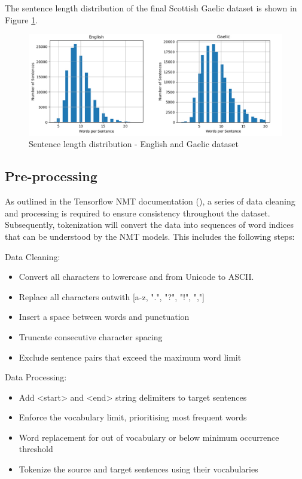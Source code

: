 The sentence length distribution of the final Scottish Gaelic dataset is shown in Figure \ref{fig:sentence_length-gaelic}.
\begin{figure}[ht!]
\centering
\includegraphics[width=1\textwidth]{media/methodology/s_length-2-en_gd.jpg}
\captionsetup{justification=centering}
\caption[Diagram of the Scottish Gaelic dataset sentence length distribution]{Sentence length distribution - English and Gaelic dataset}
\label{fig:sentence_length-gaelic}
\end{figure}


\subsection{Pre-processing}

As outlined in the Tensorflow \acrshort{NMT} documentation (\cite{tensorflow_preprocess_2020}), a series of data cleaning and processing is required to ensure consistency throughout the dataset. Subsequently, tokenization will convert the data into sequences of word indices that can be understood by the \acrshort{NMT} models. This includes the following steps:

Data Cleaning:
\begin{itemize}
    \item Convert all characters to lowercase and from Unicode to ASCII. %
    \item Replace all characters outwith [a-z, ".", "?", "!", ","]
    \item Insert a space between words and punctuation
    \item Truncate consecutive character spacing
    \item Exclude sentence pairs that exceed the maximum word limit
\end{itemize}

Data Processing:
\begin{itemize}
    \item Add <start> and <end> string delimiters to target sentences
    \item Enforce the vocabulary limit, prioritising most frequent words
    \item Word replacement for out of vocabulary or below minimum occurrence threshold
    \item Tokenize the source and target sentences using their vocabularies
\end{itemize}


